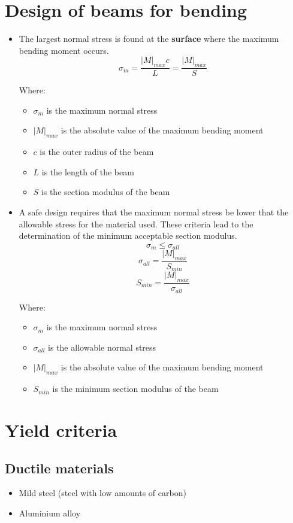 \documentclass[11pt]{article}
\begin{document}
\section{Design of beams for bending}
\label{sec:org0cc8846}
\begin{itemize}
\item The largest normal stress is found at the \textbf{surface} where the maximum bending moment occurs.
\[\sigma_m = \frac{|M|_{max} c}{L} = \frac{|M|_{max}}{S}\]

Where:
\begin{itemize}
\item \(\sigma_m\) is the maximum normal stress
\item \(|M|_{max}\) is the absolute value of the maximum bending moment
\item \(c\) is the outer radius of the beam
\item \(L\) is the length of the beam
\item \(S\) is the section modulus of the beam
\end{itemize}

\item A safe design requires that the maximum normal stress be lower that the allowable stress for the material used. These criteria lead to the determination of the minimum acceptable section modulus.
\[\sigma_m \le \sigma_{all}\]
\[\sigma_{all} = \frac{|M|_{max}}{S_{min}}\]
\[S_{min} = \frac{|M|_{max}}{\sigma_{all}}\]

Where:
\begin{itemize}
\item \(\sigma_m\) is the maximum normal stress
\item \(\sigma_{all}\) is the allowable normal stress
\item \(|M|_{max}\) is the absolute value of the maximum bending moment
\item \(S_{min}\) is the minimum section modulus of the beam
\end{itemize}
\end{itemize}

\newpage

\section{Yield criteria}
\label{sec:org4b20ef8}

\subsection{Ductile materials}
\label{sec:org1c17777}
\begin{itemize}
\item Mild steel (steel with low amounts of carbon)
\item Aluminium alloy
\end{itemize}
\end{document}
